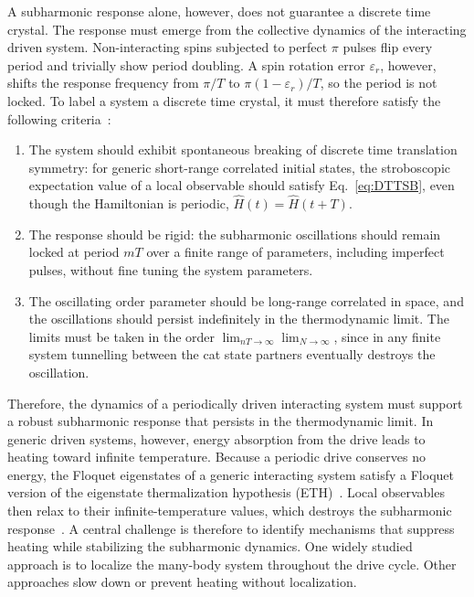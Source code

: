 \documentclass[%
reprint,
superscriptaddress,
amsmath,amssymb,
aps,
prb,
showkeys,%
floatfix,
]{revtex4-2}
\let\cite\citep   %
\begin{document}
	A subharmonic response alone, however, does not guarantee a discrete time crystal. The response must emerge from the collective dynamics of the interacting driven system. Non-interacting spins subjected to perfect $\pi$ pulses flip every period and trivially show period doubling. A spin rotation error $\varepsilon_r$, however, shifts the response frequency from $\pi/T$ to $\pi(1-\varepsilon_r)/T$, so the period is not locked. To label a system a discrete time crystal, it must therefore satisfy the following criteria~\cite{KhemaniPRL2016,ElseBauerNayak2016,YaoPRL2017}:
	\begin{enumerate}
		\renewcommand{\labelenumi}{\alph{enumi})}
		\item The system should exhibit spontaneous breaking of discrete time translation symmetry: for generic short-range correlated initial states, the stroboscopic expectation value of a local observable should satisfy Eq.~\eqref{eq:DTTSB}, even though the Hamiltonian is periodic, $\hat{H}(t)=\hat{H}(t+T)$.
		\item The response should be rigid: the subharmonic oscillations should remain locked at period $mT$ over a finite range of parameters, including imperfect pulses, without fine tuning the system parameters.
		\item The oscillating order parameter should be long-range correlated in space, and the oscillations should persist indefinitely in the thermodynamic limit. The limits must be taken in the order $\lim_{nT\to\infty}\lim_{N\to\infty}$, since in any finite system tunnelling between the cat state partners eventually destroys the oscillation.
	\end{enumerate}
	Therefore, the dynamics of a periodically driven interacting system must support a robust subharmonic response that persists in the thermodynamic limit. In generic driven systems, however, energy absorption from the drive leads to heating toward infinite temperature. Because a periodic drive conserves no energy, the Floquet eigenstates of a generic interacting system satisfy a Floquet version of the eigenstate thermalization hypothesis (ETH)~\cite{Deutsch1991ETH,Srednicki1994ETH,DAlessio2016ETH}. Local observables then relax to their infinite-temperature values, which destroys the subharmonic response~\cite{DAlessioRigol2014,LazaridesDasMoessner2014PRE}. A central challenge is therefore to identify mechanisms that suppress heating while stabilizing the subharmonic dynamics. One widely studied approach is to localize the many-body system throughout the drive cycle. Other approaches slow down or prevent heating without localization.
	
\end{document}
